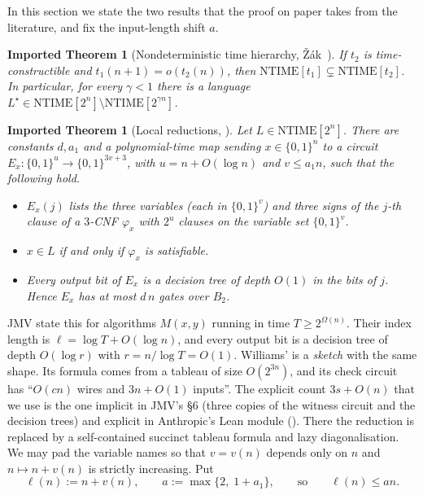 \documentclass[10pt]{amsart}
\theoremstyle{plain}
\newtheorem{importedtheorem}[theorem]{Imported Theorem}
\theoremstyle{definition}
\theoremstyle{remark}
\numberwithin{equation}{section}
\newcommand{\NTIME}{\mathrm{NTIME}}
\begin{document}
In this section we state the two results that the proof on paper takes from the literature, and fix
the input-length shift $a$.

\begin{importedtheorem}[Nondeterministic time hierarchy, \v{Z}\'ak~\cite{Zak83}]\label{imp:hier}
If $t_2$ is time-constructible and $t_1(n+1)=o(t_2(n))$, then
$\NTIME[t_1]\subsetneq\NTIME[t_2]$. In particular, for every $\gamma<1$ there is a language
$L^\star\in\NTIME[2^n]\setminus\NTIME[2^{\gamma n}]$.
\end{importedtheorem}

\begin{importedtheorem}[Local reductions, {\cite[Theorem~1 and the remark after it]{JMV15}}]\label{imp:jmv}
Let $L\in\NTIME[2^n]$. There are constants $d,a_1$ and a polynomial-time map sending
$x\in\{0,1\}^n$ to a circuit $E_x\colon\{0,1\}^{u}\to\{0,1\}^{3v+3}$, with $u=n+O(\log n)$ and
$v\le a_1 n$, such that the following hold.
\begin{itemize}
\item $E_x(j)$ lists the three variables (each in $\{0,1\}^v$) and three signs of the $j$-th clause
of a $3$-CNF $\varphi_x$ with $2^u$ clauses on the variable set $\{0,1\}^v$.
\item $x\in L$ if and only if $\varphi_x$ is satisfiable.
\item Every output bit of $E_x$ is a decision tree of depth $O(1)$ in the bits of $j$. Hence $E_x$
has at most $d\,n$ gates over $B_2$.
\end{itemize}
\end{importedtheorem}

\noindent JMV state this for algorithms $M(x,y)$ running in time $T\ge2^{\Omega(n)}$. Their index
length is $\ell=\log T+O(\log n)$, and every output bit is a decision tree of depth $O(\log r)$
with $r=n/\log T=O(1)$. Williams' \cite[Theorem~6.1]{Wil13} is a \emph{sketch} with the same
shape. Its formula comes from a tableau of size $O(2^{3n})$, and its check circuit has ``$O(cn)$
wires and $3n+O(1)$ inputs''. The explicit count $3s+O(n)$ that we use is the one implicit in JMV's
\S6 (three copies of the witness circuit and the decision trees) and explicit in Anthropic's Lean
module (). There the reduction is replaced by a self-contained succinct tableau formula
and lazy diagonalisation. We may pad the variable names so that $v=v(n)$ depends only on $n$ and
$n\mapsto n+v(n)$ is strictly increasing. Put
\[
  \ell(n):=n+v(n),\qquad a:=\max\{2,\;1+a_1\},\qquad\text{so}\qquad \ell(n)\le a n.
\]
\end{document}

